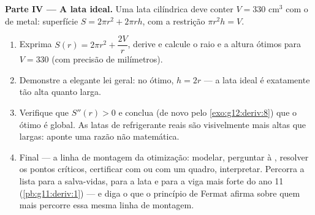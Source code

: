 \begin{problem}
\medskip
\noindent\textbf{Parte IV --- A lata ideal.}
Uma lata cilíndrica deve conter $V = 330$ cm$^3$ com o  de
metal: superfície $S = 2\pi r^2 + 2\pi r h$, com a restrição
$\pi r^2 h = V$.
\begin{enumerate}[resume]
  \item Exprima $S(r) = 2\pi r^2 + \dfrac{2V}{r}$, derive e
        calcule o raio e a altura ótimos para $V = 330$ (com
        precisão de milímetros).
  \item Demonstre a elegante lei geral: no ótimo, $h = 2r$ --- a
        lata ideal é exatamente tão alta quanto larga.
  \item Verifique que $S''(r) > 0$ e conclua (de novo pelo
        \cref{exo:g12:deriv:8}) que o ótimo é global. As latas de
        refrigerante reais são visivelmente mais altas que
        largas: aponte uma razão não matemática.
  \item Final --- a linha de montagem da otimização: modelar,
        perguntar à , resolver os pontos críticos,
        certificar com  ou com um quadro, interpretar.
        Percorra a lista para a salva-vidas, para a lata e para a
        viga mais forte do ano 11 (\cref{pb:g11:deriv:1}) --- e
        diga o que o princípio de Fermat afirma sobre quem mais
        percorre essa mesma linha de montagem.
\end{enumerate}
\end{problem}
